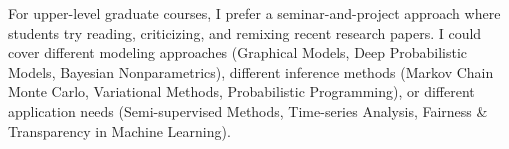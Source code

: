 \documentclass[11pt,letterpaper]{article}
\begin{document}
For upper-level graduate courses, I prefer a seminar-and-project approach where students try reading, criticizing, and remixing recent research papers. I could cover different modeling approaches (Graphical Models, Deep Probabilistic Models, Bayesian Nonparametrics), different inference methods (Markov Chain Monte Carlo, Variational Methods, Probabilistic Programming), or different application needs (Semi-supervised Methods, Time-series Analysis, Fairness \& Transparency in Machine Learning).

\end{document}
